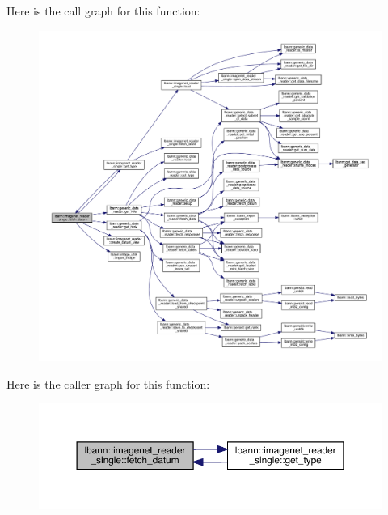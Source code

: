 Here is the call graph for this function\+:\nopagebreak
\begin{figure}[H]
\begin{center}
\leavevmode
\includegraphics[width=350pt]{classlbann_1_1imagenet__reader__single_a77c576d6085d4a8674322275dd9bd133_cgraph}
\end{center}
\end{figure}
Here is the caller graph for this function\+:\nopagebreak
\begin{figure}[H]
\begin{center}
\leavevmode
\includegraphics[width=350pt]{classlbann_1_1imagenet__reader__single_a77c576d6085d4a8674322275dd9bd133_icgraph}
\end{center}
\end{figure}
\mbox{\label{classlbann_1_1imagenet__reader__single_a17b2e9f767fe36097acbc4600ce4e480}} 
